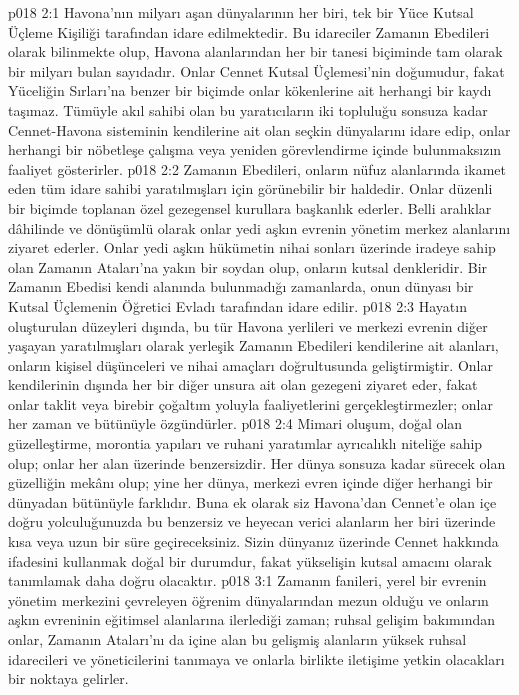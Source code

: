 \vs p018 2:1 Havona’nın milyarı aşan dünyalarının her biri, tek bir Yüce Kutsal Üçleme Kişiliği tarafından idare edilmektedir. Bu idareciler Zamanın Ebedileri olarak bilinmekte olup, Havona alanlarından her bir tanesi biçiminde tam olarak bir milyarı bulan sayıdadır. Onlar Cennet Kutsal Üçlemesi’nin doğumudur, fakat Yüceliğin Sırları’na benzer bir biçimde onlar kökenlerine ait herhangi bir kaydı taşımaz. Tümüyle akıl sahibi olan bu yaratıcıların iki topluluğu sonsuza kadar Cennet\hyp{}Havona sisteminin kendilerine ait olan seçkin dünyalarını idare edip, onlar herhangi bir nöbetleşe çalışma veya yeniden görevlendirme içinde bulunmaksızın faaliyet gösterirler.
\vs p018 2:2 Zamanın Ebedileri, onların nüfuz alanlarında ikamet eden tüm idare sahibi yaratılmışları için görünebilir bir haldedir. Onlar düzenli bir biçimde toplanan özel gezegensel kurullara başkanlık ederler. Belli aralıklar dâhilinde ve dönüşümlü olarak onlar yedi aşkın evrenin yönetim merkez alanlarını ziyaret ederler. Onlar yedi aşkın hükümetin nihai sonları üzerinde iradeye sahip olan Zamanın Ataları’na yakın bir soydan olup, onların kutsal denkleridir. Bir Zamanın Ebedisi kendi alanında bulunmadığı zamanlarda, onun dünyası bir Kutsal Üçlemenin Öğretici Evladı tarafından idare edilir.
\vs p018 2:3 Hayatın oluşturulan düzeyleri dışında, bu tür Havona yerlileri ve merkezi evrenin diğer yaşayan yaratılmışları olarak yerleşik Zamanın Ebedileri kendilerine ait alanları, onların kişisel düşünceleri ve nihai amaçları doğrultusunda geliştirmiştir. Onlar kendilerinin dışında her bir diğer unsura ait olan gezegeni ziyaret eder, fakat onlar taklit veya birebir çoğaltım yoluyla faaliyetlerini gerçekleştirmezler; onlar her zaman ve bütünüyle özgündürler.
\vs p018 2:4 Mimari oluşum, doğal olan güzelleştirme, morontia yapıları ve ruhani yaratımlar ayrıcalıklı niteliğe sahip olup; onlar her alan üzerinde benzersizdir. Her dünya sonsuza kadar sürecek olan güzelliğin mekânı olup; yine her dünya, merkezi evren içinde diğer herhangi bir dünyadan bütünüyle farklıdır. Buna ek olarak siz Havona’dan Cennet’e olan içe doğru yolculuğunuzda bu benzersiz ve heyecan verici alanların her biri üzerinde kısa veya uzun bir süre geçireceksiniz. Sizin dünyanız üzerinde Cennet hakkında  ifadesini kullanmak doğal bir durumdur, fakat yükselişin kutsal amacını  olarak tanımlamak daha doğru olacaktır.
\vs p018 3:1 Zamanın fanileri, yerel bir evrenin yönetim merkezini çevreleyen öğrenim dünyalarından mezun olduğu ve onların aşkın evreninin eğitimsel alanlarına ilerlediği zaman; ruhsal gelişim bakımından onlar, Zamanın Ataları’nı da içine alan bu gelişmiş alanların yüksek ruhsal idarecileri ve yöneticilerini tanımaya ve onlarla birlikte iletişime yetkin olacakları bir noktaya gelirler.
